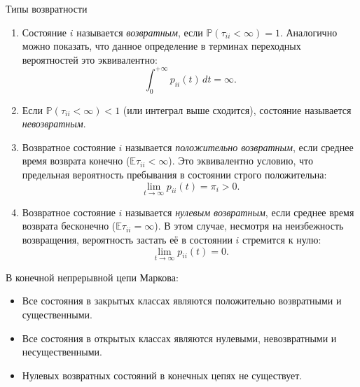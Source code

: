 \begin{definition}{Типы возвратности}
    \begin{enumerate}
        \item Состояние $i$ называется \textit{возвратным}, если $\mathbb{P}(\tau_{ii} < \infty) = 1$. Аналогично можно показать, что данное определение в терминах переходных вероятностей это эквивалентно:
            \begin{equation}
                \int_0^{+\infty} p_{ii}(t) \, dt = \infty.
            \end{equation}
        \item Если $\mathbb{P}(\tau_{ii} < \infty) < 1$ (или интеграл выше сходится), состояние называется \textit{невозвратным}.
        \item Возвратное состояние $i$ называется \textit{положительно возвратным}, если среднее время возврата конечно ($\mathbb{E}\tau_{ii} < \infty$). Это эквивалентно условию, что предельная вероятность пребывания в состоянии строго положительна:
            \begin{equation}
                \lim_{t \to \infty} p_{ii}(t) = \pi_i > 0.
            \end{equation}
        \item Возвратное состояние $i$ называется \textit{нулевым возвратным}, если среднее время возврата бесконечно ($\mathbb{E}\tau_{ii} = \infty$). В этом случае, несмотря на неизбежность возвращения, вероятность застать её в состоянии $i$ стремится к нулю:
            \begin{equation}
                \lim_{t \to \infty} p_{ii}(t) = 0.
            \end{equation}
    \end{enumerate}
\end{definition}

\begin{statement}
    В конечной непрерывной цепи Маркова:
    \begin{itemize}
        \item Все состояния в закрытых классах являются положительно возвратными и существенными.
        \item Все состояния в открытых классах являются нулевыми, невозвратными и несущественными.
        \item Нулевых возвратных состояний в конечных цепях не существует.
    \end{itemize}
\end{statement}

